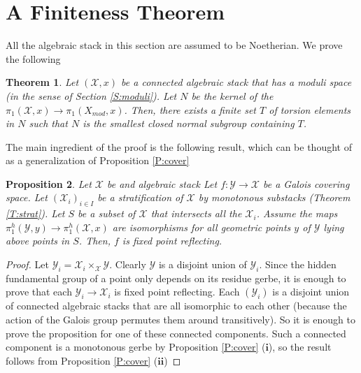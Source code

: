 \documentclass{amsart}
\newtheorem{thm}{Theorem}[section]
\newtheorem{prop}[thm]{Proposition}
\theoremstyle{definition}
\theoremstyle{remark}
\theoremstyle{remark}
\newcommand{\X}{\mathcal{X}}
\newcommand{\Y}{\mathcal{Y}}
\newcommand{\Xm}{X_{mod}}
\newcommand{\x}{\times}
\newcommand{\pX}{\pi_1(\X,x)}
\newcommand{\phX}{\pi_1^{h}(\X,x)}
\newcommand{\pXm}{\pi_1(\Xm,x)}
\newcommand{\phY}{\pi_1^{h}(\Y,y)}
\let\:=\colon
\begin{document}
\section{A Finiteness Theorem}

All the algebraic stack in this section are assumed to be
Noetherian.  We prove the following

\begin{thm}{\label{T:finite}}
Let $(\X,x)$ be a connected algebraic stack that has a moduli
space (in the sense of Section \ref{S:moduli}). Let $N$ be the
kernel of the $\pX \to \pXm$.  Then, there exists a finite set $T$
of torsion elements in $N$ such that $N$ is the smallest closed
normal subgroup containing $T$.
\end{thm}

 The main ingredient of the proof is the following result, which
 can be thought of as a generalization of Proposition
 \ref{P:cover}

\begin{prop}{\label{P:cover2}}
Let $\X$ be and algebraic stack Let $f \: \Y \to \X$  be a Galois
covering space. Let $(\X_i)_{i \in I}$ be a stratification of $\X$
by monotonous substacks (Theorem \ref{T:strat}). Let $S$ be a
subset of  $\X$ that intersects all the $\X_i$. Assume the maps
$\phY \to \phX$ are isomorphisms for all geometric points $y$ of
$\Y$ lying above points in $S$. Then,  $f$ is fixed point
reflecting.
\end{prop}

\begin{proof}
Let $\Y_i =\X_i \x_{\X} \Y$. Clearly $\Y$ is a disjoint union of
$\Y_i$. Since the hidden fundamental group of a point only depends
on its residue gerbe, it is enough to prove that  each $\Y_i \to
\X_i$ is fixed point reflecting. Each $(\Y_i)$ is a disjoint union
of connected algebraic stacks that are all isomorphic to each
other (because the action of the Galois group permutes them around
transitively). So it is enough to prove the proposition for one of
these connected components. Such a connected component is a
monotonous gerbe by Proposition \ref{P:cover} ($\mathbf{i}$), so
the result follows from Proposition \ref{P:cover} ($\mathbf{ii}$)
\end{proof}
\end{document}
